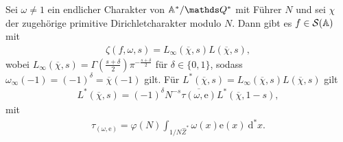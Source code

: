 \begin{thm}
Sei $\omega \not =1$ ein endlicher Charakter von $\A^\ast/\Q^\ast$
mit Führer $N$ und sei $\chi$ der zugehörige primitive Dirichletcharakter modulo $N$.
Dann gibt es $f \in \mathcal{S}(\mathbb{A})$ mit
\begin{align*}
\zeta(f,\omega,s)=L_\infty(\overline{\chi},s) L(\overline{\chi},s),
\end{align*}
wobei $L_\infty(\overline{\chi},s)=\Gamma(\frac{s+\delta}{2})\pi^{-\frac{s+\delta}{2}}$ für $\delta \in \{0,1\}$, sodass $\omega_\infty(-1)=(-1)^\delta=\overline{\chi}(-1)$ gilt.
Für $L^\ast(\overline{\chi},s)=L_\infty(\overline{\chi},s)L(\overline{\chi},s)$ gilt
\begin{align*}
L^\ast(\overline{\chi},s)=(-1)^\delta N^{-s}\overline{\tau(\omega,\mathrm{e})} L^\ast (\overline{\chi},1-s),
\end{align*}
mit
\begin{align*}
\tau_(\omega,\mathrm{e})=\varphi(N)\int_{1/N \hat{Z} ^\ast} \omega(x)\mathrm{e}(x)~\mathrm{d}^\ast x.
\end{align*}
\end{thm}
